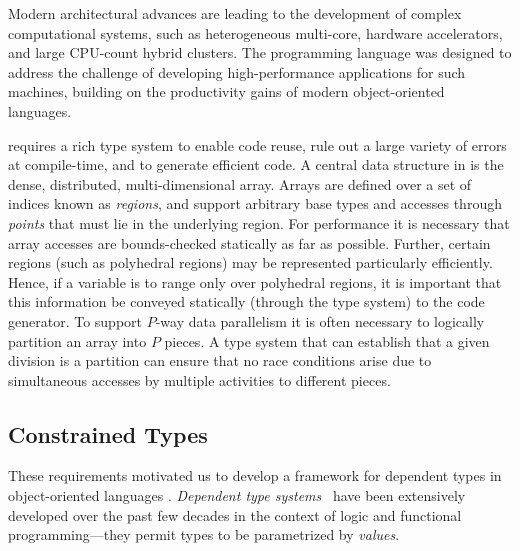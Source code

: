 

Modern architectural advances are leading to the development of
complex computational systems, such as heterogeneous multi-core,
hardware accelerators, and large CPU-count hybrid clusters.
The \Xten{} programming language \cite{X10-concur,x10-oopsla05,X10} was
designed to address the challenge of developing
high-performance applications for such machines, building on the
productivity gains of modern object-oriented languages.

\Xten{} requires a rich type system
to enable code reuse, rule out a large variety of errors at
compile-time, and to generate efficient code.
A central
data structure in \Xten{} is the dense, distributed, multi-dimensional
array.  Arrays are defined over a set of indices known as \emph{regions},
and support arbitrary base types and accesses through {\em
points} that must lie in the underlying region. For performance it is
necessary that array accesses are
bounds-checked statically as far as possible.
Further, certain regions (such as
polyhedral regions) may be represented particularly
efficiently.  Hence, if a variable is to range only over
polyhedral regions, it is important that this information be conveyed
statically (through the type system) to the code 
generator. To support $P$-way data parallelism it is often necessary
to logically partition an array into $P$ pieces. A type system that
can establish that a given division is a partition can ensure that no
race conditions arise due to simultaneous accesses by
multiple activities to different pieces.

\subsection{Constrained Types}

These requirements motivated us to develop a framework for dependent
types in object-oriented languages \cite{constrained-types}.
\emph{Dependent type
systems}~\cite{dependent-types,xi99dependent,calc-constructions} have
been extensively developed over the past few decades in the context of
logic and functional programming---they permit types to be
parametrized by \emph{values}.

